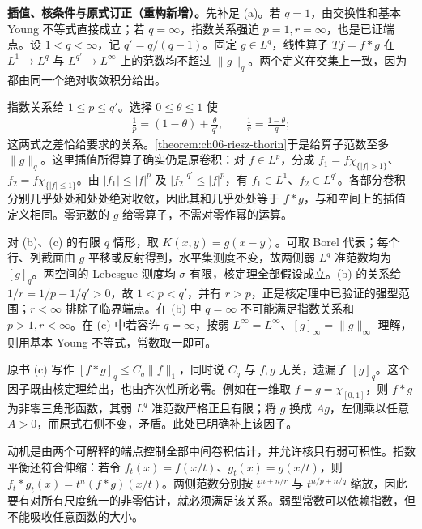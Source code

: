 \documentclass[../../main.tex]{subfiles}
\begin{document}
\begin{remark}
\textbf{插值、核条件与原式订正（重构新增）。}先补足 (a)。若 $q=1$，由交换性和基本 Young 不等式直接成立；若 $q=\infty$，指数关系强迫 $p=1,r=\infty$，也是已证端点。设 $1<q<\infty$，记 $q'=q/(q-1)$。固定 $g\in L^q$，线性算子 $Tf=f*g$ 在 $L^1\to L^q$ 与 $L^{q'}\to L^\infty$ 上的范数均不超过 $\|g\|_q$。两个定义在交集上一致，因为都由同一个绝对收敛积分给出。

指数关系给 $1\leqslant p\leqslant q'$。选择 $0\leqslant\theta\leqslant1$ 使
\begin{align*}
\frac1p=(1-\theta)+\frac\theta{q'},\qquad
\frac1r=\frac{1-\theta}{q};
\end{align*}
这两式之差恰给要求的关系。\cref{theorem:ch06-riesz-thorin}于是给算子范数至多 $\|g\|_q$。这里插值所得算子确实仍是原卷积：对 $f\in L^p$，分成 $f_1=f\chi_{\{|f|>1\}}$、$f_2=f\chi_{\{|f|\leqslant1\}}$。由 $|f_1|\leqslant|f|^p$ 及 $|f_2|^{q'}\leqslant|f|^p$，有 $f_1\in L^1$、$f_2\in L^{q'}$。各部分卷积分别几乎处处和处处绝对收敛，因此其和几乎处处等于 $f*g$，与和空间上的插值定义相同。零范数的 $g$ 给零算子，不需对零作幂的运算。

对 (b)、(c) 的有限 $q$ 情形，取 $K(x,y)=g(x-y)$。可取 Borel 代表；每个行、列截面由 $g$ 平移或反射得到，水平集测度不变，故两侧弱 $L^q$ 准范数均为 $[g]_q$。两空间的 Lebesgue 测度均 $\sigma$ 有限，核定理全部假设成立。(b) 的关系给
$1/r=1/p-1/q'>0$，故 $1<p<q'$，并有 $r>p$，正是核定理中已验证的强型范围；$r<\infty$ 排除了临界端点。在 (b) 中 $q=\infty$ 不可能满足指数关系和 $p>1,r<\infty$。在 (c) 中若容许 $q=\infty$，按弱 $L^\infty=L^\infty$、$[g]_\infty=\|g\|_\infty$ 理解，则用基本 Young 不等式，常数取一即可。

原书 (c) 写作 $[f*g]_q\leqslant C_q\|f\|_1$，同时说 $C_q$ 与 $f,g$ 无关，遗漏了 $[g]_q$。这个因子既由核定理给出，也由齐次性所必需。例如在一维取 $f=g=\chi_{[0,1]}$，则 $f*g$ 为非零三角形函数，其弱 $L^q$ 准范数严格正且有限；将 $g$ 换成 $Ag$，左侧乘以任意 $A>0$，而原式右侧不变，矛盾。此处已明确补上该因子。

动机是由两个可解释的端点控制全部中间卷积估计，并允许核只有弱可积性。指数平衡还符合伸缩：若令 $f_t(x)=f(x/t)$、$g_t(x)=g(x/t)$，则 $f_t*g_t(x)=t^n(f*g)(x/t)$。两侧范数分别按 $t^{n+n/r}$ 与 $t^{n/p+n/q}$ 缩放，因此要有对所有尺度统一的非零估计，就必须满足该关系。弱型常数可以依赖指数，但不能吸收任意函数的大小。
\end{remark}

\end{document}
